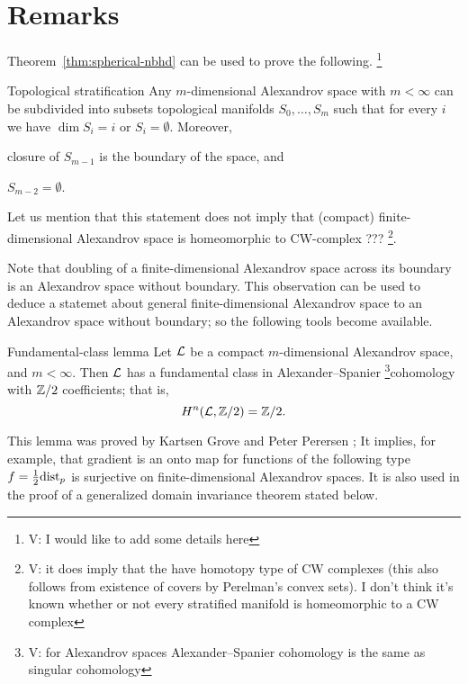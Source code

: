 \section{Remarks}

Theorem~\ref{thm:spherical-nbhd} can be used to prove the following. \footnote{\red V:  I would like to add some details here}

\begin{thm}{Topological stratification}\label{thm:top-stratification}
Any $m$-dimensional Alexandrov space with $m<\infty$ can be subdivided into subsets topological manifolds $S_0,\dots,S_m$ such that for every $i$ we have $\dim S_i=i$ or $S_i=\emptyset$.
Moreover,
\begin{subthm}{}
closure of $S_{m-1}$ is the boundary of the space, and
\end{subthm}

\begin{subthm}{}
$S_{m-2}=\emptyset$.
\end{subthm}

\end{thm}

Let us mention that this statement does not imply that (compact) finite-dimensional Alexandrov space is homeomorphic to CW-complex ???
\footnote{\red V: it does imply that the have homotopy type of CW complexes (this also follows from existence of covers by Perelman's convex sets). I don't think it's known whether or not every stratified manifold is homeomorphic to a CW complex}.

Note that doubling of a finite-dimensional Alexandrov space across its boundary is an Alexandrov space without boundary.
This observation can be used to deduce a statemet about general finite-dimensional Alexandrov space to an Alexandrov space without boundary;
so the following tools become available.

\begin{thm}{Fundamental-class lemma}\label{lem:fund-class}
Let $\mathcal{L}$ be a compact $m$-dimensional Alexandrov space, and $m<\infty$.
Then $\mathcal{L}$ has a fundamental class in Alexander--Spanier \footnote{\red V: for Alexandrov spaces  Alexander--Spanier  cohomology is the same as singular cohomology }cohomology with $\mathbb{Z}/2$ coefficients; 
that is, 
\[H^n(\mathcal{L},\mathbb{Z}/2)=\mathbb{Z}/2.\]

\end{thm}

This lemma was proved by Kartsen Grove and Peter Perersen \cite{grove-petersen};
It implies, for example, that gradient is an onto map  for functions of the following type $f=\tfrac12\mathrm{dist}_p$ is surjective on finite-dimensional Alexandrov spaces.
It is also used in the proof of a generalized domain invariance theorem stated below. 

